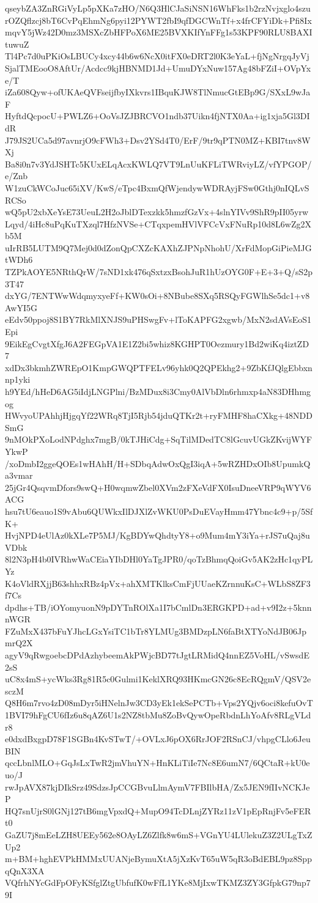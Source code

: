 qseybZA3ZnRGiVyLp5pXKa7zHO/N6Q3HlCJaSiNSN16WhFks1b2rzNvjxglo4szu
rOZQflzcj8bT6CvPqEhmNg6pyi12PYWT2fbI9qfDGCWnTf+x4frCFYiDk+Pfi8Ix
mqvY5jWz42D0mz3MSXcZbHFPoX6ME25BVXKIfYnFFg1s53KPF90RLU8BAXItuwuZ
Tl4Pc7d0uPKiOsLBUCy4xcy44b6w6NcX0itFX0eDRT2l0K3eYaL+fjNgNrgqJyVj
SjalTMEooO8AftUr/Acdcc9kjHBNMD1Jd+UmuDYxNuw157Ag48bFZiI+OVpYxe/T
iZa608Qyw+ofUKAeQVFseijfbyIXkvrs1IBquKJW8TlNmucGtEBp9G/SXxL9wJaF
HyftdQcpocU+PWLZ6+OoVsJZJBRCVO1ndb37Uikn4fjNTX0Aa+ig1xja5Gl3DIdR
J79JS2UCa5d97avnrjO9cFWh3+Dsv2YSd4T0/ErF/9tr9qPTN0MZ+KBI7tnv8WXj
Ba8i0n7v3YdJSHTc5KUxELqAcxKWLQ7VT9LnUuKFLiTWRviyLZ/vfYPGOP/e/Znb
W1zuCkWCoJuc65iXV/KwS/eTpc4BxmQfWjendywWDRAyjFSw0Gthj0nIQLvSRCSo
wQ5pU2xbXeYsE73UeuL2H2oJblDTexzkk5hmzfGzVx+4slnYIVv9ShR9pII05yrw
Lqyd/4iHc8uPqKuTXzql7HfzNVSe+CTqxpemHVlVFCcVxFNuRp10d8L6wZg2Xb5M
uIrRB5LUTM9Q7Mej0d0dZonQpCXZcKAXhZJPNpNhohU/XrFdMopGiPieMJGtWDh6
TZPkAOYE5NRthQrW/7sND1xk476qSxtzxBsohJuR1hUzOYG0F+E+3+Q/sS2p3T47
dxYG/7ENTWwWdqmyxyeFf+KW0sOi+8NBube8SXq5RSQyFGWlhSe5dc1+v8AwYI5G
eEdv50ppoj8S1BY7RkMlXNJS9uPHSwgFv+lToKAPFG2xgwb/MxN2sdAVsEoS1Epi
9EikEgCvgtXfgJ6A2FEGpVA1E1Z2bi5whiz8KGHPT0Oezmury1Bd2wiKq4iztZD7
xdDx3bkmhZWREpO1KmpGWQPTFELv96yhk0Q2QPEkhg2+9ZbKfJQlgEbbxnnp1yki
h9YEd/hHeD6AG5iIdjLNGPlni/BzMDux8i3Cmy0AlVbDln6rhmxp4aN83DHhmgog
HWvyoUPAhhjHjgqYf22WRq8TjI5Rjb54jduQTKr2t+ryFMHF8haCXkg+48NDDSmG
9nMOkPXoLodNPdghx7mgB/0kTJHiCdg+SqTilMDedTC8lGcuvUGkZKvijWYFYkwP
/xoDmbI2ggeQOEs1wHAhH/H+SDbqAdwOxQgI3iqA+5wRZHDxOIb8UpumkQa3vmar
25jGr4QsqvmDfors9swQ+H0wqmwZbel0XVm2zFXeVdFX0IsuDneeVRP9qWYV6ACG
hsu7tU6eauo1S9vAbu6QUWkxIlDJXlZvWKU0PsDuEVayHmm47Ybnc4c9+p/5SfK+
HvjNPD4eUlAz0kXLe7P5MJ/KgBDYwQhdtyY8+o9Mum4mY3iYa+rJS7uQaj8uVDbk
8l2N3pH4b0IVRhwWaCEiaYIbDHl0YaTgJPR0/qoTzBhmqQoiGv5AK2zHc1qyPLYz
K4oVldRXjjB63shhxRBz4pVx+ahXMTKlksCmFjUUaeKZrnnuKsC+WLbS8ZF3f7Cs
dpdhs+TB/iOYomyuonN9pDYTnROlXa1I7bCmlDn3ERGKPD+ad+v9I2z+5knnnWGR
FZuMxX437bFuYJhcLGxYsiTC1bTr8YLMUg3BMDzpLN6faBtXTYoNdJB06JpmrQ2X
agyV9qRwgoebcDPdAzhybeemAkPWjcBD77tJgtLRMidQ4nnEZ5VoHL/vSwsdE2sS
uC8x4mS+ycWks3Rg81R5c0Gulmi1KeklXRQ93HKmcGN26c8EcRQgmV/QSV2esczM
Q8H6m7rvo4zD08mDyr5iHNelnJw3CD3yEk1ekSePCTb+Vps2YQjv6oci8kefuOvT
1BVI79hFgCU6fIz6u8qAZ6U1s2NZ8tbMu8ZoBvQywOpeRbdnLhYoAfv8RLgVLdr8
e0dxdBxgpD78F1SGBn4KvSTwT/+OVLxJ6pOX6RrJOF2RSnCJ/vhpgCLlo6JeuBIN
qccLbnlMLO+GqJsLxTwR2jmVhuYN+HnKLiTiIe7Nc8E6umN7/6QCtaR+kU0euo/J
rwJpAVX87kjDIkSrz49SdzsJpCCGBvuLlmAymV7FBIlbHA/Zx5JEN9fIIvNCKJeP
HQ7snUjrS0lGNj127tB6mgVpxdQ+MupO94TcDLnjZYRz11zV1pEpRnjFv5eFERt0
GaZU7j8mEeLZH8UEEy562e8OAyLZ6Zlfk8w6mS+VGnYU4LUlekuZ3Z2ULgTxZUp2
m+BM+hghEVPkHMMxUUANjeBymuXtA5jXzKvT65uW5qR3oBdEBL9pz8SppqQnX3XA
VQfrhNYcGdFpOFyKSfglZtgUbfufK0wFfL1YKe8MjIxwTKMZ3ZY3GfpkG79np79I

